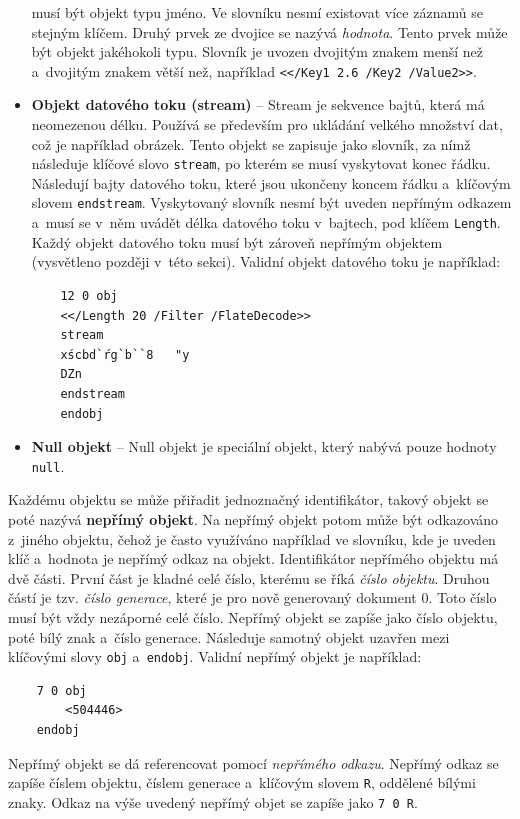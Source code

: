 \begin{itemize}
    musí být objekt typu jméno. Ve slovníku nesmí existovat více záznamů se
    stejným klíčem. Druhý prvek ze dvojice se nazývá \emph{hodnota}.
    Tento prvek může být objekt jakéhokoli typu. Slovník je uvozen dvojitým znakem
    menší než a~dvojitým znakem větší než, například
    \texttt{<</Key1 2.6 /Key2 /Value2>>}.
    \item \textbf{Objekt datového toku (stream)} -- Stream je sekvence bajtů, 
    která má neomezenou délku. Používá se především pro ukládání velkého množství
    dat, což je například obrázek. Tento objekt se zapisuje jako slovník, za nímž
    následuje klíčové slovo \texttt{stream}, po kterém se musí vyskytovat konec
    řádku. Následují bajty datového toku, které jsou ukončeny koncem řádku
    a~klíčovým slovem \texttt{endstream}. Vyskytovaný slovník nesmí být uveden
    nepřímým odkazem a~musí se v~něm uvádět délka datového toku v~bajtech, pod
    klíčem \texttt{Length}. Každý objekt datového toku musí být zároveň nepřímým
    objektem (vysvětleno později v~této sekci). Validní objekt datového toku je
    například:
\begin{verbatim}
    12 0 obj
    <</Length 20 /Filter /FlateDecode>>
    stream
    xścbd`ŕg`b``8	"y
    DZn
    endstream
    endobj
\end{verbatim}
    \item \textbf{Null objekt} -- Null objekt je speciální objekt, který nabývá
    pouze hodnoty \texttt{null}.
\end{itemize}

Každému objektu se může přiřadit jednoznačný identifikátor, takový objekt se poté
nazývá \textbf{nepřímý objekt}. Na nepřímý objekt potom může být odkazováno
z~jiného objektu, čehož je často využíváno například ve slovníku, kde je uveden
klíč a~hodnota je nepřímý odkaz na objekt. Identifikátor nepřímého objektu má dvě
části. První část je kladné celé číslo, kterému se říká \emph{číslo objektu}.
Druhou částí je tzv. \emph{číslo generace}, které je pro nově generovaný dokument
0. Toto číslo musí být vždy nezáporné celé číslo. Nepřímý objekt se zapíše jako
číslo objektu, poté bílý znak a~číslo generace. Následuje samotný objekt uzavřen
mezi klíčovými slovy \texttt{obj} a~\texttt{endobj}. Validní nepřímý objekt je
například:
\begin{verbatim}
    7 0 obj
        <504446>
    endobj
\end{verbatim}
Nepřímý objekt se dá referencovat pomocí \emph{nepřímého odkazu}. Nepřímý odkaz
se zapíše číslem objektu, číslem generace a~klíčovým slovem \texttt{R}, oddělené
bílými znaky. Odkaz na výše uvedený nepřímý objet se zapíše jako \texttt{7 0 R}.


